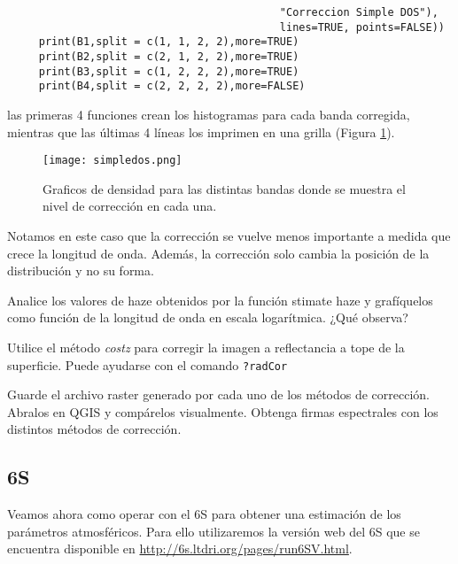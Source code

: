 \begin{exa}
\begin{lstlisting}
                                           "Correccion Simple DOS"),
                                           lines=TRUE, points=FALSE))
     print(B1,split = c(1, 1, 2, 2),more=TRUE)
     print(B2,split = c(2, 1, 2, 2),more=TRUE)
     print(B3,split = c(1, 2, 2, 2),more=TRUE)
     print(B4,split = c(2, 2, 2, 2),more=FALSE)
    \end{lstlisting}
    las primeras 4 funciones crean los histogramas para cada banda
    corregida, mientras que las \'ultimas 4 l\'ineas los imprimen en una grilla (Figura \ref{fig:simpledos}).
    \begin{figure}[h!]
    \begin{center}
        \texttt{[image: simpledos.png]}
    \end{center}
    \caption{Graficos de densidad para las distintas bandas donde se
        muestra el nivel de correcci\'on en cada una.}
    \label{fig:simpledos}
    \end{figure}
Notamos en este caso que la correcci\'on se vuelve menos importante a medida
que crece la longitud de onda. Adem\'as, la correcci\'on solo cambia la
posici\'on de la distribuci\'on y no su forma.

\end{exa}
\begin{act}
    Analice los valores de haze obtenidos por la funci\'on stimate haze y graf\'iquelos
    como funci\'on de la longitud de onda en escala logar\'itmica. ¿Qu\'e observa?
\end{act}

\begin{act}
    Utilice el m\'etodo \emph{costz} para corregir la imagen a reflectancia a tope
    de la superficie. Puede ayudarse con el comando \texttt{?radCor}
\end{act}

\begin{act}
    Guarde el archivo raster generado por cada uno de los m\'etodos de
    correcci\'on. Abralos en QGIS y comp\'arelos visualmente. Obtenga firmas
    espectrales con los distintos m\'etodos de correcci\'on.
\end{act}


\subsection{6S}
\label{sub:corr:6S}

Veamos ahora como operar con el 6S para obtener una estimaci\'on de los par\'ametros
atmosf\'ericos. Para ello utilizaremos la versi\'on web del 6S que se encuentra
disponible en \url{http://6s.ltdri.org/pages/run6SV.html}.

